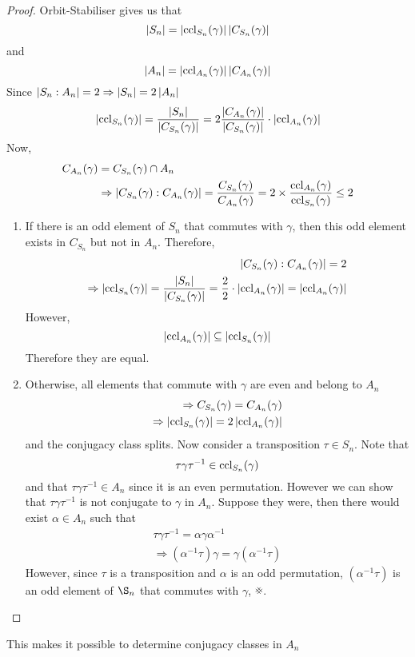 \documentclass{article}
\begin{document}
\begin{proof}
    Orbit-Stabiliser gives us that
    \[
        \left\lvert S_n\right\rvert = \left\lvert \operatorname{ccl}_{S_n}(\gamma)\right\rvert \left\lvert C_{S_n}(\gamma)\right\rvert  
    \]
    and
    \[
        \left\lvert A_n\right\rvert = \left\lvert \operatorname{ccl}_{A_n}(\gamma)\right\rvert \left\lvert C_{A_n}(\gamma)\right\rvert  
    \]
    Since $\left\lvert S_n : A_n\right\rvert = 2 \Rightarrow \left\lvert S_n\right\rvert = 2 \left\lvert A_n\right\rvert$
    \[
        \left\lvert \operatorname{ccl}_{S_n}(\gamma)\right\rvert = \frac{\left\lvert S_n\right\rvert}{\left\lvert C_{S_n}(\gamma)\right\rvert} = 2 \frac{\left\lvert C_{A_n}(\gamma)\right\rvert}{\left\lvert C_{S_n}(\gamma)\right\rvert} \cdot \left\lvert \operatorname{ccl}_{A_n}(\gamma)\right\rvert
    \]
    Now, 
    \begin{align*}
        C_{A_n}(\gamma) &= C_{S_n}(\gamma) \cap A_n \\
        &\Rightarrow \left\lvert C_{S_n}(\gamma) : C_{A_n}(\gamma)\right\rvert = \frac{C_{S_n}(\gamma)}{C_{A_n}(\gamma)} = 2 \times \frac{\operatorname{ccl}_{A_n}(\gamma)}{\operatorname{ccl}_{S_n}(\gamma)} \leq 2
    \end{align*}
    \begin{enumerate}
        \item If there is an odd element of $S_n$ that commutes with $\gamma$, then this odd element exists in $C_{S_n}$ but not in $A_n$. 
        Therefore, 
        \begin{align*}
            \left\lvert C_{S_n}(\gamma) : C_{A_n}(\gamma)\right\rvert = 2 \\
            \Rightarrow \left\lvert \operatorname{ccl}_{S_n}(\gamma)\right\rvert = \frac{\left\lvert S_n\right\rvert}{\left\lvert C_{S_n}(\gamma)\right\rvert} = \frac{2}{2} \cdot \left\lvert \operatorname{ccl}_{A_n}(\gamma)\right\rvert = \left\lvert \operatorname{ccl}_{A_n}(\gamma)\right\rvert
        \end{align*}
        However, 
        \[
            \left\lvert \operatorname{ccl}_{A_n}(\gamma)\right\rvert \subseteq \left\lvert \operatorname{ccl}_{S_n}(\gamma)\right\rvert 
        \]
        Therefore they are equal.

        \item Otherwise, all elements that commute with $\gamma$ are even and belong to $A_n$
        \begin{align*}
            \Rightarrow C_{S_n}(\gamma) = C_{A_n}(\gamma) \\
            \Rightarrow \left\lvert \operatorname{ccl}_{S_n}(\gamma)\right\rvert = 2 \left\lvert \operatorname{ccl}_{A_n}(\gamma)\right\rvert
        \end{align*}
        and the conjugacy class splits. Now consider a transposition $\tau \in S_n$. Note that
        \[
            \tau \gamma \tau^{-1} \in \operatorname{ccl}_{S_n}(\gamma)  
        \]
        and that $\tau \gamma \tau^{-1} \in A_n$ since it is an even permutation.
        However we can show that $\tau \gamma \tau^{-1}$ is not conjugate to $\gamma$ in $A_n$.
        Suppose they were, then there would exist $\alpha \in A_n$ such that
        \begin{align*}
            \tau \gamma \tau^{-1} = \alpha \gamma \alpha^{-1} \\
            \Rightarrow (\alpha^{-1} \tau) \gamma = \gamma (\alpha^{-1} \tau)
        \end{align*}
        However, since $\tau$ is a transposition and $\alpha$ is an odd permutation, $(\alpha^{-1} \tau)$ is an odd element of $\S_n$ that commutes with $\gamma$, $\contradiction$.
    \end{enumerate}
\end{proof}
This makes it possible to determine conjugacy classes in $A_n$
\end{document}
